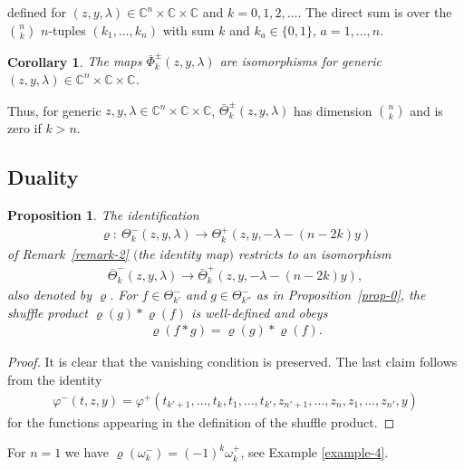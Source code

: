 \documentclass[pdftex]{sigma}
\numberwithin{equation}{section}
\newtheorem{Corollary}[Theorem]{Corollary}
\newtheorem{Proposition}[Theorem]{Proposition}
 { \theoremstyle{definition}
\newtheorem{Definition}[Theorem]{Definition}
\newtheorem{Example}[Theorem]{Example}
\newtheorem{Remark}[Theorem]{Remark} }
\begin{document}
defined for $(z,y,\lambda)\in\mathbb C^n\times \mathbb C\times \mathbb C$ and $k=0,1,2,\dots$. The direct sum is over the ${n \choose k}$ $n$-tuples $(k_1,\dots,k_n)$ with sum $k$ and $k_a\in\{0,1\}$, $a=1,\dots,n$.
\begin{Corollary}\label{cor-0} The maps $\bar\Phi_k^{\pm}(z,y,\lambda)$ are isomorphisms for generic $(z,y,\lambda)\in\mathbb C^n\times \mathbb C\times \mathbb C$.
\end{Corollary}

Thus, for generic $z,y,\lambda\in\mathbb C^n\times\mathbb C\times\mathbb C$, $\bar\Theta^\pm_k(z,y,\lambda)$ has dimension ${n \choose k}$ and is zero if $k>n$.

\subsection{Duality}\label{ss-3.4}
\begin{Proposition}\label{p-duality} The identification
\begin{gather*}
 \varrho\colon \ \Theta^-_k(z,y,\lambda)\to \Theta^+_k(z,y,-\lambda-(n-2k)y)
\end{gather*}
of Remark~{\rm \ref{remark-2}} $($the identity map$)$ restricts to an isomorphism
\begin{gather*}
 \bar \Theta^-_k(z,y,\lambda)\to \bar\Theta^+_k(z,y,-\lambda-(n-2k)y),
\end{gather*}
also denoted by $\varrho$. For $f\in\Theta^-_{k'}$ and $g\in\Theta^-_{k''}$ as in Proposition~{\rm \ref{prop-0}}, the shuffle product $\varrho(g)*\varrho(f)$ is well-defined and obeys
\begin{gather*}
 \varrho(f*g)=\varrho(g)*\varrho(f).
\end{gather*}
\end{Proposition}
\begin{proof} It is clear that the vanishing condition is preserved. The last claim follows from the identity
 \begin{gather*}
 \varphi^-(t,z,y)= \varphi^+(t_{k'+1},\dots,t_k,t_1,\dots,t_{k'},z_{n'+1},\dots,z_n,z_1,\dots,z_{n'},y)
 \end{gather*}
 for the functions appearing in the definition of the shuffle product.
\end{proof}

\begin{Remark}\label{remark-4} For $n=1$ we have $\varrho(\omega^-_k)=(-1)^k\omega^+_k$, see Example \ref{example-4}.
\end{Remark}
\end{document}

